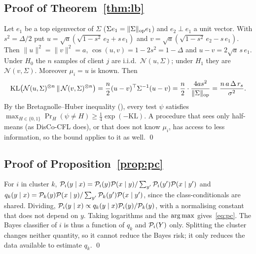 \subsection{Proof of Theorem~\ref{thm:lb}}
Let $e_1$ be a top eigenvector of $\Sigma$ ($\Sigma e_1=\|\Sigma\|_{\mathrm{op}} e_1$) and $e_2\perp e_1$ a unit vector. With $s^2=\Delta/2$ put
$u=\sqrt a(\sqrt{1-s^2}\,e_2+s\,e_1)$ and $v=\sqrt a(\sqrt{1-s^2}\,e_2-s\,e_1)$. Then $\|u\|^2=\|v\|^2=a$, $\cos(u,v)=1-2s^2=1-\Delta$ and $u-v=2\sqrt a\,s\,e_1$. Under $H_0$ the $n$ samples of client $j$ are i.i.d.\ $\mathcal N(u,\Sigma)$; under $H_1$ they are $\mathcal N(v,\Sigma)$. Moreover $\mu_i=u$ is known. Then
\[\mathrm{KL}\big(\mathcal N(u,\Sigma)^{\otimes n}\,\|\,\mathcal N(v,\Sigma)^{\otimes n}\big)=\frac n2(u-v)^\top\Sigma^{-1}(u-v)=\frac n2\cdot\frac{4as^2}{\|\Sigma\|_{\mathrm{op}}}=\frac{n\,a\,\Delta\,r_s}{\sigma^2}.\]
By the Bretagnolle--Huber inequality (\citealp[Thm.~2.2]{tsybakov2009}), every test $\psi$ satisfies $\max_{H\in\{0,1\}}\Pr_H(\psi\neq H)\ge\frac14\exp(-\mathrm{KL})$. A procedure that sees only half-means (as DisCo-CFL does), or that does not know $\mu_i$, has access to less information, so the bound applies to it as well. \qed

\subsection{Proof of Proposition~\ref{prop:pc}}
For $i$ in cluster $k$, $\mathcal{P}_i(y\mid x)=\mathcal{P}_i(y)\mathcal{P}(x\mid y)/\sum_{y'}\mathcal{P}_i(y')\mathcal{P}(x\mid y')$ and $q_k(y\mid x)=\mathcal{P}_k(y)\mathcal{P}(x\mid y)/\sum_{y'}\mathcal{P}_k(y')\mathcal{P}(x\mid y')$, since the class-conditionals are shared. Dividing, $\mathcal{P}_i(y\mid x)\propto q_k(y\mid x)\mathcal{P}_i(y)/\mathcal{P}_k(y)$, with a normalising constant that does not depend on $y$. Taking logarithms and the $\operatorname*{arg\,max}$ gives~\eqref{eq:pc}. The Bayes classifier of $i$ is thus a function of $q_k$ and $\mathcal{P}_i(Y)$ only. Splitting the cluster changes neither quantity, so it cannot reduce the Bayes risk; it only reduces the data available to estimate $q_k$. \qed

